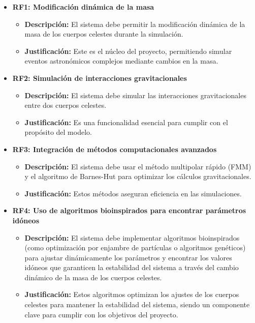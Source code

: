 \begin{itemize}
    \item \textbf{RF1: Modificación dinámica de la masa}
    \begin{itemize}
        \item \textbf{Descripción:} El sistema debe permitir la modificación dinámica de la masa de los cuerpos celestes durante la simulación.
        \item \textbf{Justificación:} Este es el núcleo del proyecto, permitiendo simular eventos astronómicos complejos mediante cambios en la masa.
    \end{itemize}
    \item \textbf{RF2: Simulación de interacciones gravitacionales}
    \begin{itemize}
        \item \textbf{Descripción:} El sistema debe simular las interacciones gravitacionales entre dos cuerpos celestes.
        \item \textbf{Justificación:} Es una funcionalidad esencial para cumplir con el propósito del modelo.
    \end{itemize}
    \item \textbf{RF3: Integración de métodos computacionales avanzados}
    \begin{itemize}
        \item \textbf{Descripción:} El sistema debe usar el método multipolar rápido (FMM) y el algoritmo de Barnes-Hut para optimizar los cálculos gravitacionales.
        \item \textbf{Justificación:} Estos métodos aseguran eficiencia en las simulaciones.
    \end{itemize}
    \item \textbf{RF4: Uso de algoritmos bioinspirados para encontrar parámetros idóneos}
    \begin{itemize}
        \item \textbf{Descripción:} El sistema debe implementar algoritmos bioinspirados (como optimización por enjambre de partículas o algoritmos genéticos) para ajustar dinámicamente los parámetros y encontrar los valores idóneos que garanticen la estabilidad del sistema a través del cambio dinámico de la masa de los cuerpos celestes.
        \item \textbf{Justificación:} Estos algoritmos optimizan los ajustes de los cuerpos celestes para mantener la estabilidad del sistema, siendo un componente clave para cumplir con los objetivos del proyecto.
    \end{itemize}

\end{itemize}
